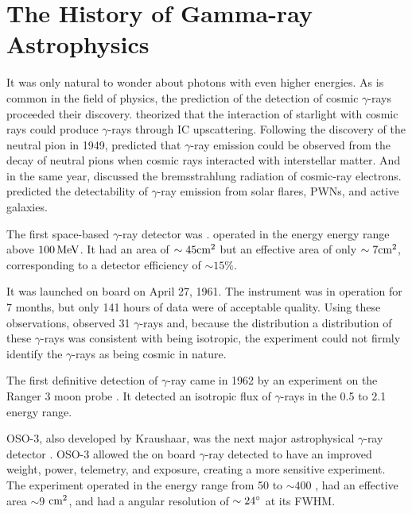 \section{The History of Gamma-ray Astrophysics}

It was only natural to wonder about photons with even
higher energies. 
As is common in the field of physics, the prediction of
the detection of cosmic $\gamma$-rays proceeded their discovery.
\cite{feenberg_1948_interaction-cosmic-ray} theorized that the interaction
of starlight with cosmic rays could produce $\gamma$-rays through
\ac{IC} upscattering.  Following the discovery of the neutral
pion in 1949, \cite{hayakawa_1952_propagation-cosmic}
predicted that $\gamma$-ray emission could be observed from the
decay of neutral pions when cosmic rays interacted with interstellar
matter.  And in the same year, \cite{hutchinson_1952_possible-relation}
discussed the bremsstrahlung radiation of cosmic-ray electrons.
\cite{morrison_1958_gamma-ray-astronomy} predicted the detectability
of $\gamma$-ray emission from solar flares, \acp{PWN}, and active galaxies.

The first space-based $\gamma$-ray detector was \explorerxi
\citep{kraushaar_1965_explorer-experiment}.  
\explorerxi operated in the energy energy range above $100\,\text{MeV}$.
It had an area of $\sim45\text{cm}^2$ but an effective area of only $\sim
7\text{cm}^2$, corresponding to a detector efficiency of $\sim 15\%$.

It was launched on board \explorerxi on April 27, 1961. The instrument
was in operation for 7 months, but only 141 hours of data were of
acceptable quality.  Using these observations, \explorerxi observed
31 $\gamma$-rays and, because the distribution a distribution of these
$\gamma$-rays was consistent with being isotropic, the experiment could
not firmly identify the $\gamma$-rays as being cosmic in nature.

The first definitive detection of $\gamma$-ray came in
1962 by an experiment on the Ranger 3 moon
probe \citep{arnold_1962_gamma-space}.  It detected an isotropic flux
of $\gamma$-rays in the 0.5 \mev to 2.1 \mev energy range.

\Ac{OSO-3}, also developed by Kraushaar, 
was the next major astrophysical $\gamma$-ray detector
\citep{kraushaar_1972_high-energy-cosmic}.  \Ac{OSO-3} 
allowed the on board $\gamma$-ray detected to have an improved weight,
power, telemetry, and exposure, creating a more sensitive experiment.
The experiment operated in the energy range from 50 \mev to $\sim 400$
\mev, had an effective area $\sim 9$ $\text{cm}^2$, and had a angular resolution of
$\sim 24^\circ$ at its \ac{FWHM}.

